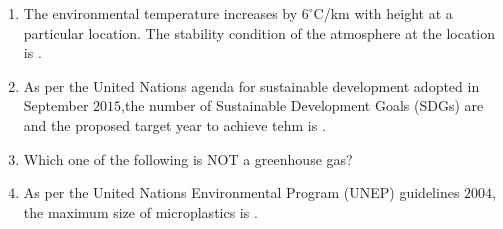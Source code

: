 \documentclass[journal]{IEEEtran}
\numberwithin{equation}{enumi}
\numberwithin{figure}{enumi}
\begin{document}
\begin{enumerate}[start=1, label={Q\arabic*.}]
\begin{enumerate}[label=(\Alph*)]
  \end{enumerate}
\item The environmental temperature increases by $6^{\circ}$C/km with height at a particular location. The stability condition of the atmosphere at the location is \underline{\hspace{1.5cm}}.
  \begin{enumerate}[label=(\Alph*)]
  \end{enumerate}
\item As per the United Nations agenda for sustainable development adopted in September $2015$,the number of Sustainable Development Goals (SDGs) are \underline{\hspace{1.5cm}} and the proposed target year to achieve tehm is \underline{\hspace{1.5cm}}.
  \begin{enumerate}[label=(\Alph*)]
  \end{enumerate}
\item Which one of the following is NOT a greenhouse gas?
 \begin{enumerate}[label=(\Alph*)]
  \end{enumerate}
\item As per the United Nations Environmental Program (UNEP) guidelines $2004$, the maximum size of microplastics is \underline{\hspace{1.5cm}}.

\end{enumerate}
\end{document}
